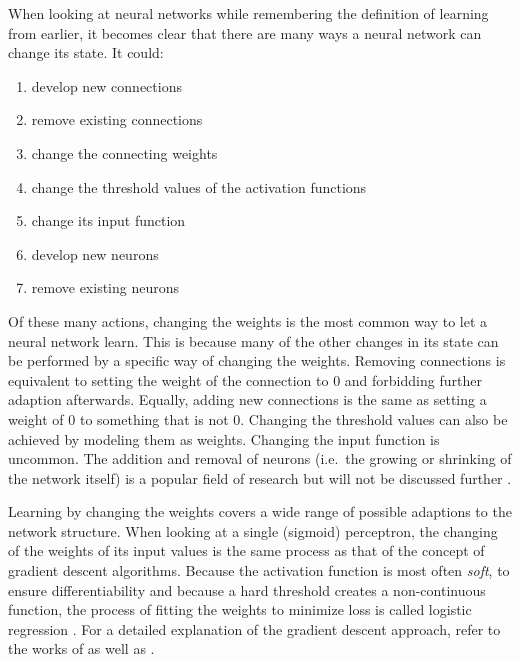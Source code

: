 When looking at neural networks while remembering the definition of learning from earlier, it becomes clear that there are many
ways a neural network can change its state. It could:

\begin{enumerate}
    \item develop new connections
    \item remove existing connections
    \item change the connecting weights
    \item change the threshold values of the activation functions
    \item change its input function
    \item develop new neurons
    \item remove existing neurons \cite[p.60]{kriesel2007brief}
\end{enumerate}

Of these many actions, changing the weights is the most common way to let a neural network learn. This is because many
of the other changes in its state can be performed by a specific way of changing the weights. Removing connections is
equivalent to setting the weight of the connection to 0 and forbidding further adaption afterwards. Equally, adding new
connections is the same as setting a weight of 0 to something that is not 0. Changing the threshold values can also be
achieved by modeling them as weights. Changing the input function is uncommon. The addition and removal of neurons
(i.e.\ the growing or shrinking of the network itself) is a popular field of research but will not be discussed further
\cite[p.60]{kriesel2007brief}.

Learning by changing the weights covers a wide range of possible adaptions to the network structure. When
looking at a single (sigmoid) perceptron, the changing of the weights of its input values is the same process as that of the
concept of gradient descent algorithms. Because the activation function is most often \emph{soft}, to ensure
differentiability and because a hard threshold creates a non-continuous function, the process of fitting the weights to
minimize loss is called logistic regression \cite[p.729f.]{russell2016artificial}. For a detailed explanation of the gradient
descent approach, refer to the works of \citet{russell2016artificial} as well as
\citet{Goodfellow-et-al-2016}.




